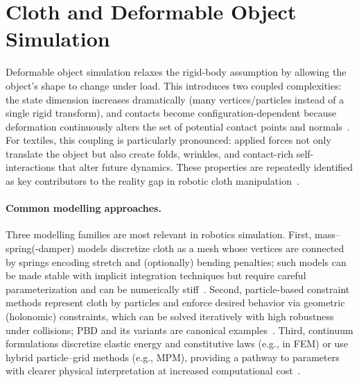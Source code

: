 
\section{Cloth and Deformable Object Simulation}\label{sec:cloth_sim}

Deformable object simulation relaxes the rigid-body assumption by allowing the object's
shape to change under load. This introduces two coupled complexities: the state dimension
increases dramatically (many vertices/particles instead of a single rigid transform), and
contacts become configuration-dependent because deformation continuously alters the set of
potential contact points and normals~\cite{Nealen2006DeformableModels,Longhini2025ReviewClothManipulation}.
For textiles, this coupling is particularly pronounced: applied forces not only translate the
object but also create folds, wrinkles, and contact-rich self-interactions that alter future
dynamics. These properties are repeatedly identified as key contributors to the reality gap in
robotic cloth manipulation~\cite{Longhini2025ReviewClothManipulation}.

\paragraph{Common modelling approaches.}
Three modelling families are most relevant in robotics simulation.
First, mass--spring(-damper) models discretize cloth as a mesh whose vertices are connected
by springs encoding stretch and (optionally) bending penalties; such models can be made
stable with implicit integration techniques but require careful parameterization and can be
numerically stiff~\cite{BaraffWitkin1998LargeStepsCloth}.
Second, particle-based constraint methods represent cloth by particles and enforce desired
behavior via geometric (holonomic) constraints, which can be solved iteratively with high
robustness under collisions; \ac{PBD} and its variants are canonical examples~\cite{muller2007pbd,macklin2016xpbd}.
Third, continuum formulations discretize elastic energy and constitutive laws (e.g., in
\ac{FEM}) or use hybrid particle--grid methods (e.g., \ac{MPM}), providing a pathway to
parameters with clearer physical interpretation at increased computational cost~\cite{SifakisBarbic2012FEM,Jiang2016MPM}.

